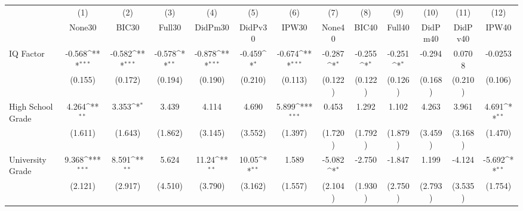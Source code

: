 {
\def\sym#1{\ifmmode^{#1}\else\(^{#1}\)\fi}
\begin{tabular}{l*{12}{c}}
\toprule
            &\multicolumn{1}{c}{(1)}&\multicolumn{1}{c}{(2)}&\multicolumn{1}{c}{(3)}&\multicolumn{1}{c}{(4)}&\multicolumn{1}{c}{(5)}&\multicolumn{1}{c}{(6)}&\multicolumn{1}{c}{(7)}&\multicolumn{1}{c}{(8)}&\multicolumn{1}{c}{(9)}&\multicolumn{1}{c}{(10)}&\multicolumn{1}{c}{(11)}&\multicolumn{1}{c}{(12)}\\
            &\multicolumn{1}{c}{None30}&\multicolumn{1}{c}{BIC30}&\multicolumn{1}{c}{Full30}&\multicolumn{1}{c}{DidPm30}&\multicolumn{1}{c}{DidPv30}&\multicolumn{1}{c}{IPW30}&\multicolumn{1}{c}{None40}&\multicolumn{1}{c}{BIC40}&\multicolumn{1}{c}{Full40}&\multicolumn{1}{c}{DidPm40}&\multicolumn{1}{c}{DidPv40}&\multicolumn{1}{c}{IPW40}\\
\midrule
IQ Factor   &      -0.568\sym{***}&      -0.582\sym{***}&      -0.578\sym{**} &      -0.878\sym{***}&      -0.459\sym{*}  &      -0.674\sym{***}&      -0.287\sym{*}  &      -0.255\sym{*}  &      -0.251\sym{*}  &      -0.294         &      0.0708         &     -0.0253         \\
            &     (0.155)         &     (0.172)         &     (0.194)         &     (0.190)         &     (0.210)         &     (0.113)         &     (0.122)         &     (0.122)         &     (0.126)         &     (0.168)         &     (0.210)         &     (0.106)         \\
\addlinespace
High School Grade&       4.264\sym{**} &       3.353\sym{*}  &       3.439         &       4.114         &       4.690         &       5.899\sym{***}&       0.453         &       1.292         &       1.102         &       4.263         &       3.961         &       4.691\sym{**} \\
            &     (1.611)         &     (1.643)         &     (1.862)         &     (3.145)         &     (3.552)         &     (1.397)         &     (1.720)         &     (1.792)         &     (1.879)         &     (3.459)         &     (3.168)         &     (1.470)         \\
\addlinespace
University Grade&       9.368\sym{***}&       8.591\sym{**} &       5.624         &       11.24\sym{**} &       10.05\sym{**} &       1.589         &      -5.082\sym{*}  &      -2.750         &      -1.847         &       1.199         &      -4.124         &      -5.692\sym{**} \\
            &     (2.121)         &     (2.917)         &     (4.510)         &     (3.790)         &     (3.162)         &     (1.557)         &     (2.104)         &     (1.930)         &     (2.750)         &     (2.793)         &     (3.535)         &     (1.754)         \\

\end{tabular}}
